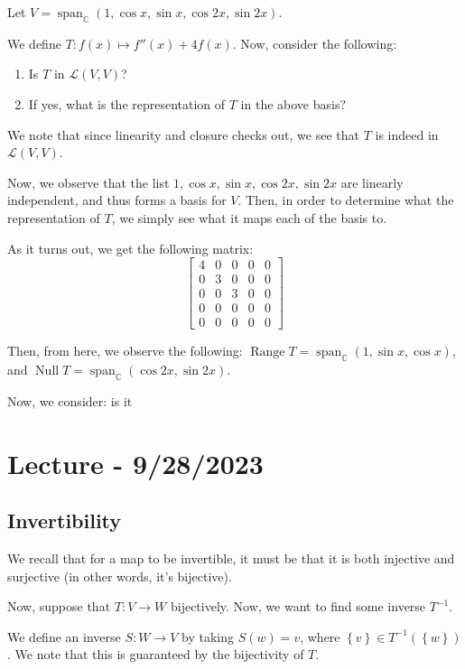 \documentclass[openany]{book}
\newcommand{\CC}{\mathbb{C}}
\DeclareMathOperator*{\Null}{Null}
\DeclareMathOperator*{\Range}{Range}
\DeclareMathOperator*{\vspan}{span}
\begin{document}
\begin{example}
	Let $V = \vspan_{\CC} (1, \cos x , \sin x , \cos 2x, \sin 2x)$.
	
	We define $T : f(x) \mapsto f''(x) + 4f(x)$. Now, consider the following:
	\begin{enumerate}
		\item Is $T$ in $\mathcal L(V,V)$?
		\item If yes, what is the representation of $T$ in the above basis?
	\end{enumerate}

	We note that since linearity and closure checks out, we see that $T$ is indeed in $\mathcal L (V,V)$.
	
	Now, we observe that the list $1, \cos x, \sin x, \cos 2x, \sin 2x$ are linearly independent, and thus forms a basis for $V$. Then, in  order to determine what the representation of $T$, we simply see what it maps each of the basis to.
	
	As it turns out, we get the following matrix:
	\begin{equation*}
		\begin{bmatrix}
			4 & 0 & 0 & 0 & 0 \\
			0 & 3 & 0 & 0 & 0 \\
			0 & 0 & 3 & 0 & 0 \\
			0 & 0 & 0 & 0 & 0 \\
			0 & 0 & 0 & 0 & 0
		\end{bmatrix}
	\end{equation*}

	Then, from here, we observe the following: $\Range T = \vspan_\CC (1, \sin x, \cos x)$, and $\Null T = \vspan_\CC (\cos 2x, \sin 2x)$.
	
	Now, we consider: is it 
\end{example}

\section{Lecture - 9/28/2023}
\subsection{Invertibility}
We recall that for a map to be invertible, it must be that it is both injective and surjective (in other words, it's bijective).

Now, suppose that $T : V \rightarrow W$ bijectively. Now, we want to find some inverse $T^{-1}$.

We define an inverse $S : W \rightarrow V$ by taking $S(w) = v$, where $\left\{  v \right\} \in T^{-1}(\left\{  w \right\})$. We note that this is guaranteed by the bijectivity of $T$.
\end{document}
